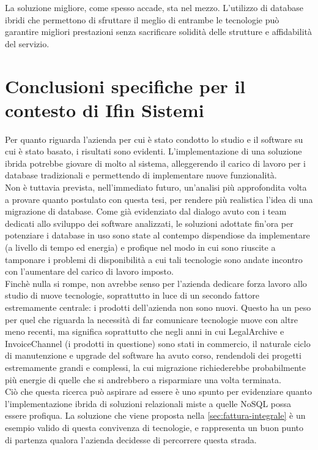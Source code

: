 \noindent La soluzione migliore, come spesso accade, sta nel mezzo. L'utilizzo di database ibridi che permettono di sfruttare il meglio di entrambe le tecnologie può garantire migliori prestazioni senza sacrificare solidità delle strutture e affidabilità del servizio.\\


\section{Conclusioni specifiche per il contesto di Ifin Sistemi}
Per quanto riguarda l'azienda per cui è stato condotto lo studio e il software su cui è stato basato, i risultati sono evidenti. L'implementazione di una soluzione ibrida potrebbe giovare di molto al sistema, alleggerendo il carico di lavoro per i database tradizionali e permettendo di implementare nuove funzionalità.\\

\noindent Non è tuttavia prevista, nell'immediato futuro, un'analisi più approfondita volta a provare quanto postulato con questa tesi, per rendere più realistica l'idea di una migrazione di database. Come già evidenziato dal dialogo avuto con i team dedicati allo sviluppo dei software analizzati, le soluzioni adottate fin'ora per potenziare i database in uso sono state al contempo dispendiose da implementare (a livello di tempo ed energia) e profique nel modo in cui sono riuscite a tamponare i problemi di disponibilità a cui tali tecnologie sono andate incontro con l'aumentare del carico di lavoro imposto.\\
Finchè nulla si rompe, non avrebbe senso per l'azienda dedicare forza lavoro allo studio di nuove tecnologie, soprattutto in luce di un secondo fattore estremamente centrale: i prodotti dell'azienda non sono nuovi. Questo ha un peso per quel che riguarda la necessità di far comunicare tecnologie nuove con altre meno recenti, ma significa soprattutto che negli anni in cui LegalArchive e InvoiceChannel (i prodotti in questione) sono stati in commercio, il naturale ciclo di manutenzione e upgrade del software ha avuto corso, rendendoli dei progetti estremamente grandi e complessi, la cui migrazione richiederebbe probabilmente più energie di quelle che si andrebbero a risparmiare una volta terminata.\\

\noindent Ciò che questa ricerca può aspirare ad essere è uno spunto per evidenziare quanto l'implementazione ibrida di soluzioni relazionali miste a quelle NoSQL possa essere profiqua. La soluzione che viene proposta nella \autoref{sec:fattura-integrale} è un esempio valido di questa convivenza di tecnologie, e rappresenta un buon punto di partenza qualora l'azienda decidesse di percorrere questa strada.\\


